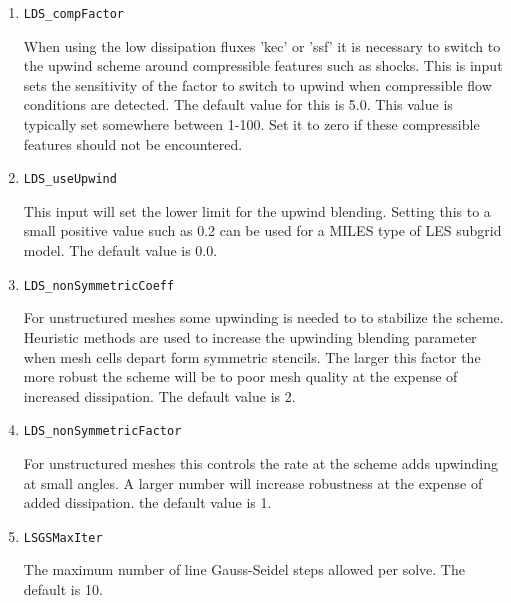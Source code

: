 \documentclass{article}
\begin{document}
\begin{enumerate}




\item {\tt LDS\_compFactor}

  When using the low dissipation fluxes 'kec' or 'ssf' it is necessary
  to switch to the upwind scheme around compressible features such as
  shocks.  This is input sets the sensitivity of the factor to switch
  to upwind when compressible flow conditions are detected.  The
  default value for this is 5.0.  This value is typically set
  somewhere between 1-100.  Set it to zero if these compressible
  features should not be encountered.

\item {\tt LDS\_useUpwind}

  This input will set the lower limit for the upwind blending.
  Setting this to a small positive value such as 0.2 can be used for a
  MILES type of LES subgrid model.  The default value is 0.0.

\item {\tt LDS\_nonSymmetricCoeff}

  For unstructured meshes some upwinding is needed to to stabilize the
  scheme.  Heuristic methods are used to increase the upwinding
  blending parameter when mesh cells depart form symmetric stencils.
  The larger this factor the more robust the scheme will be to poor
  mesh quality at the expense of increased dissipation. The default
  value is 2.

\item {\tt LDS\_nonSymmetricFactor}

  For unstructured meshes this controls the rate at the scheme adds
  upwinding at small angles.  A larger number will increase robustness
  at the expense of added dissipation.  the default value is 1.

\item {\tt LSGSMaxIter} 

  The maximum number of line Gauss-Seidel steps
  allowed per solve. The default is 10.


\end{enumerate}
\end{document}
